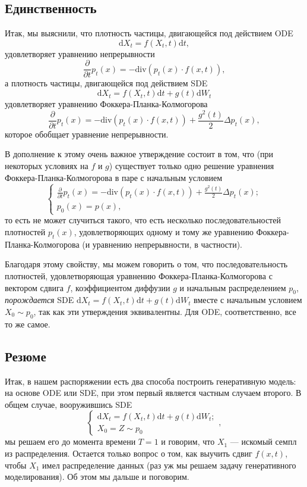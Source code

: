 \documentclass[12pt]{article}
\theoremstyle{definition}
\begin{document}
\subsection{Единственность}
\label{sub:unique}
Итак, мы выяснили, что плотность частицы, двигающейся под действием ODE
\[
    \mathrm{d} X_t = f(X_t, t) \mathrm{d} t,
\]
удовлетворяет уравнению непрерывности
\[
    \frac{\partial}{\partial t} p_t(x) = - \text{div}\left(p_t(x) \cdot f(x, t) \right),
\]
а плотность частицы, двигающейся под действием SDE
\[
    \mathrm{d} X_t = f(X_t, t) \mathrm{d} t + g(t) \mathrm{d} W_t
\]
удовлетворяет уравнению Фоккера-Планка-Колмогорова
\[
    \frac{\partial}{\partial t} p_t(x) = - \text{div}\left(p_t(x) \cdot f(x, t) \right) + \frac{g^2(t)}{2} \Delta p_t(x),
\]
которое обобщает уравнение непрерывности.

В дополнение к этому очень важное утверждение состоит в том, что (при некоторых условиях на $f$ и $g$) существует только одно решение уравнения Фоккера-Планка-Колмогорова в паре с начальным условием
\[
    \begin{cases}
        \frac{\partial}{\partial t} p_t(x) = - \text{div}\left(p_t(x) \cdot f(x, t) \right) + \frac{g^2(t)}{2} \Delta p_t(x);\\
        p_0(x) = p(x),
    \end{cases}
\]
то есть не может случиться такого, что есть несколько последовательностей плотностей $p_t(x)$, удовлетворяющих одному и тому же уравнению Фоккера-Планка-Колмогорова (и уравнению непрерывности, в частности). 

Благодаря этому свойству, мы можем говорить о том, что последовательность плотностей, удовлетворяющая уравнению Фоккера-Планка-Колмогорова с вектором сдвига $f$, коэффициентом диффузии $g$ и начальным распределением $p_0$, \emph{порождается} SDE $\mathrm{d} X_t = f(X_t, t) \mathrm{d} t + g(t) \mathrm{d} W_t$ вместе с начальным условием $X_0 \sim p_0$, так как эти утверждения эквивалентны. Для ODE, соответственно, все то же самое.

\subsection{Резюме}
Итак, в нашем распоряжении есть два способа построить генеративную модель: на основе ODE или SDE, при этом первый является частным случаем второго. В общем случае, вооружившись SDE
\[
    \begin{cases}
        \mathrm{d} X_t = f(X_t, t) \mathrm{d} t + g(t) \mathrm{d} W_t;\\
        X_0 = Z \sim p_0
    \end{cases},
\]
мы решаем его до момента времени $T = 1$ и говорим, что $X_1$ --- искомый семпл из распределения. Остается только вопрос о том, как выучить сдвиг $f(x, t)$, чтобы $X_1$ имел распределение данных (раз уж мы решаем задачу генеративного моделирования). Об этом мы дальше и поговорим.
\end{document}
